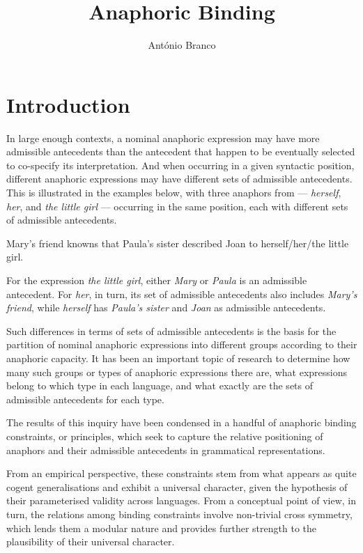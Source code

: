\documentclass[output=paper
,modfonts
,nonflat]{langsci/langscibook}
\title{Anaphoric Binding}
\author{%
 Ant\'onio Branco\affiliation{University of Lisbon}
}
\begin{document}
\maketitle
\section{Introduction} 


In large enough contexts, a nominal anaphoric expression may have more
admissible antecedents than the antecedent that happen
to be eventually selected to co-specify its interpretation. 
And when occurring in a given syntactic position, different anaphoric expressions may 
have different sets of admissible antecedents. This is illustrated in the examples 
below, with three anaphors from  --- \textit{herself}, \textit{her},  and \textit{the little girl} --- 
occurring in the same position, each with different sets of admissible antecedents.

\begin{exe}
\ex Mary's friend knowns that Paula's sister described Joan to \linebreak
herself/her/the little girl.
\end{exe}

For the expression \textit{the little girl}, either \textit{Mary} or \textit{Paula} is an admissible antecedent. 
For \textit{her}, in turn, its set of admissible antecedents also includes \textit{Mary's friend}, while
\textit{herself} has \textit{Paula's sister} and \textsl{Joan} as admissible antecedents.

Such differences in terms of sets of admissible antecedents is the basis for 
the partition of nominal anaphoric expressions into different groups according to their anaphoric
capacity. It has been an important topic of research to determine
how many such  groups or types of anaphoric expressions there are, what expressions belong
to which type in each language, and what exactly are the sets of admissible antecedents for each type.

The results of this inquiry have been condensed in a handful of anaphoric 
binding constraints, or principles, which seek to capture the relative positioning of anaphors and their 
admissible antecedents in grammatical representations. 

From an empirical perspective, these constraints stem
from what appears as quite cogent generalisations and exhibit a universal
character, given the hypothesis of their parameterised validity across languages.
From a conceptual point of view, in turn, the relations among binding
constraints involve non-trivial cross symmetry, which lends them a modular nature
and provides further strength to the plausibility of their universal character.%
  
\end{document}
